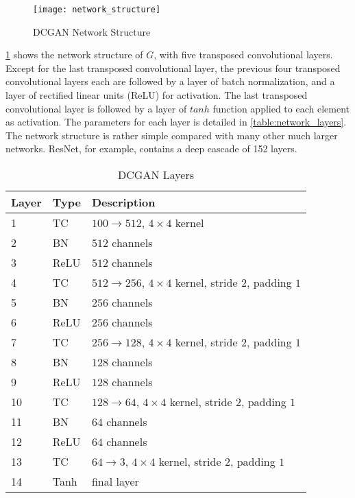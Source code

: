\begin{figure}[h]
  \centering
  \texttt{[image: network\_structure]}
  \caption{DCGAN Network Structure}
  \label{fig:network_structure}
\end{figure}

\ref{fig:network_structure} shows the network structure of $G$, with five transposed convolutional layers.
Except for the last transposed convolutional layer, the previous four transposed convolutional layers each
are followed by a layer of batch normalization, and a layer of rectified linear units (ReLU) for
activation. The last transposed convolutional layer is followed by a layer of $tanh$ function applied to
each element as activation. The parameters for each layer is detailed in \ref{table:network_layers}.
The network structure is rather simple compared with many other much larger networks. ResNet, for example,
contains a deep cascade of 152 layers.

\begin{table}[h]
  \centering
  \caption{DCGAN Layers}
  \begin{tabular}{l | l | l }
    \toprule
    Layer & Type & Description \\
    \midrule
    1 & TC & $100 \rightarrow 512$, $4 \times 4$ kernel\\
    2 & BN & $512$ channels\\
    3 & ReLU & $512$ channels \\
    4 & TC & $512 \rightarrow 256$, $4 \times 4$ kernel, stride $2$, padding $1$ \\
    5 & BN & $256$ channels \\
    6 & ReLU & $256$ channels \\
    7 & TC & $256 \rightarrow 128$, $4 \times 4$ kernel, stride $2$, padding $1$ \\
    8 & BN & $128$ channels \\
    9 & ReLU & $128$ channels \\
    10 & TC & $128 \rightarrow 64$, $4 \times 4$ kernel, stride $2$, padding $1$ \\
    11 & BN & $64$ channels \\
    12 & ReLU & $64$ channels \\
    13 & TC & $64 \rightarrow 3$, $4 \times 4$ kernel, stride $2$, padding $1$ \\
    14 & Tanh & final layer \\
    \bottomrule
  \end{tabular}
  \label{table:memory_requirements}
\end{table}

\clearpage %
